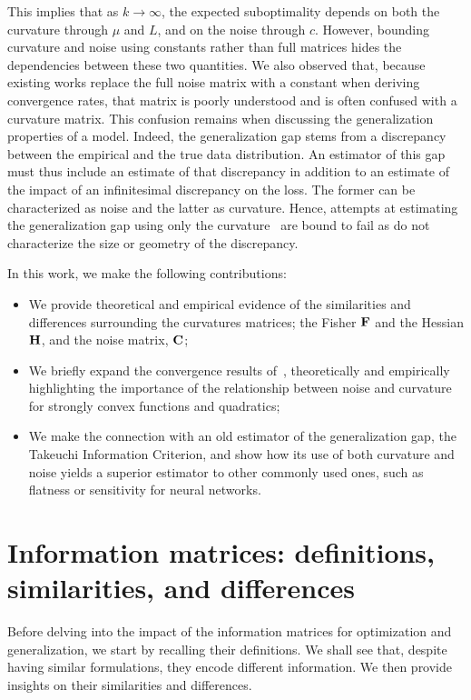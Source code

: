 This implies that as $k\to \infty$, the expected suboptimality depends on both the curvature through $\mu$ and $L$, and on the noise through $c$. However, bounding curvature and noise using constants rather than full matrices hides the dependencies between these two quantities. We also observed that, because existing works replace the full noise matrix with a constant when deriving convergence rates, that matrix is poorly understood and is often confused with a curvature matrix.
This confusion remains when discussing the generalization properties of a model. Indeed, the generalization gap stems from a discrepancy between the empirical and the true data distribution. An estimator of this gap must thus include an estimate of that discrepancy in addition to an estimate of the impact of an infinitesimal discrepancy on the loss. The former can be characterized as noise and the latter as curvature. Hence, attempts at estimating the generalization gap using only the curvature~\citep{keskar2016large,novak2018sensitivity} are bound to fail as do not characterize the size or geometry of the discrepancy.

In this work, we make the following contributions:
\begin{itemize}
    \item We provide theoretical and empirical evidence of the similarities and differences surrounding the curvatures matrices; the Fisher ${\mathbf{F}}$ and the Hessian ${\mathbf{H}}$, and the noise matrix, ${\mathbf{C}}$;
    \item We briefly expand the convergence results of~\citet{schmidt2014convergence}, theoretically and empirically highlighting the importance of the relationship between noise and curvature for strongly convex functions and quadratics;
    \item We make the connection with an old estimator of the generalization gap, the Takeuchi Information Criterion, and show how its use of both curvature and noise yields a superior estimator to other commonly used ones, such as flatness or sensitivity for neural networks.
\end{itemize}

\section{Information matrices: definitions, similarities, and differences}
\label{sec:hfc}
Before delving into the impact of the information matrices for optimization and generalization, we start by recalling their definitions. We shall see that, despite having similar formulations, they encode different information. We then provide insights on their similarities and differences.


